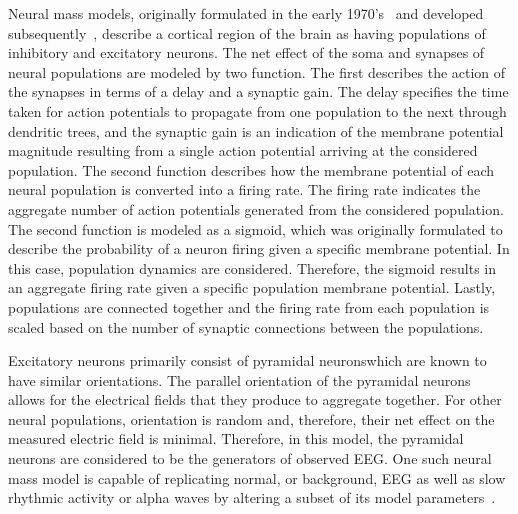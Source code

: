 Neural mass models, originally formulated in the early 1970's~\citep{wilson1973mathematical,lopes1974model,freeman1963electrical} and developed subsequently~\citep{jansen1995electroencephalogram}, describe a cortical region of the brain as having populations of inhibitory and excitatory neurons. The net effect of the soma and synapses of neural populations are modeled by two function. The first describes the action of the synapses in terms of a delay and a synaptic gain. The delay specifies the time taken for action potentials to propagate from one population to the next through dendritic trees, and the synaptic gain is an indication of the membrane potential magnitude resulting from a single action potential arriving at the considered population. The second function describes how the membrane potential of each neural population is converted into a firing rate. The firing rate indicates the aggregate number of action potentials generated from the considered population. The second function is modeled as a sigmoid, which was originally formulated to describe the probability of a neuron firing given a specific membrane potential. In this case, population dynamics are considered. Therefore, the sigmoid results in an aggregate firing rate given a specific population membrane potential. Lastly, populations are connected together and the firing rate from each population is scaled based on the number of synaptic connections between the populations. 

Excitatory neurons primarily consist of pyramidal neurons\iref which are known to have similar orientations. The parallel orientation of the pyramidal neurons allows for the electrical fields that they produce to aggregate together. For other neural populations, orientation is random and, therefore, their net effect on the measured electric field is minimal. Therefore, in this model, the pyramidal neurons are considered to be the generators of observed EEG. One such neural mass model is capable of replicating normal, or background, EEG as well as slow rhythmic activity or alpha waves by altering a subset of its model parameters~\citep{jansen1995electroencephalogram}.

